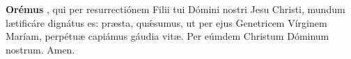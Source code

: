 \textbf{Orémus}
, qui per resurrectiónem Filii tui Dómini nostri Jesu Christi,
mundum l{\ae}tificáre dignátus es: pr{\ae}sta, qu{\'\ae}sumus, ut per ejus Genetricem Vírginem Maríam,
perpétu{\ae} capiámus gáudia vit{\ae}. Per eúmdem Christum Dóminum nostrum. Amen.